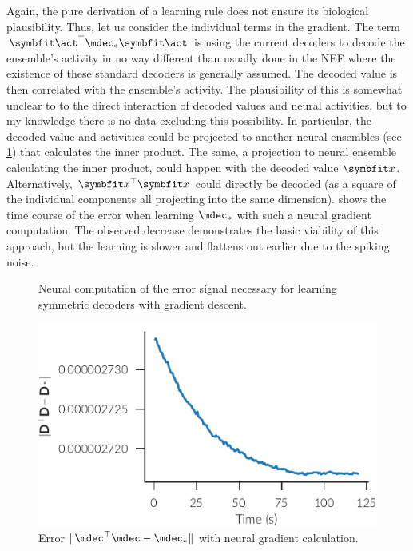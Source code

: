 Again, the pure derivation of a learning rule does not ensure its biological plausibility.
Thus, let us consider the individual terms in the gradient.
The term $\vc\act\Tr \mdec_* \vc\act$ is using the current decoders to decode the ensemble's activity in no way different than usually done in the NEF where the existence of these standard decoders is generally assumed.
The decoded value is then correlated with the ensemble's activity.
The plausibility of this is somewhat unclear to to the direct interaction of decoded values and neural activities, but to my knowledge there is no data excluding this possibility.
In particular, the decoded value and activities could be projected to another neural ensembles (see \cref{fig:aml-grad-desc}) that calculates the inner product.
The same, a projection to neural ensemble calculating the inner product, could happen with the decoded value $\vc x$.
Alternatively, $\vc x\Tr \vc x$ could directly be decoded (as a square of the individual components all projecting into the same dimension).
 shows the time course of the error when learning $\mdec_*$ with such a neural gradient computation.
The observed decrease demonstrates the basic viability of this approach, but the learning is slower and flattens out earlier due to the spiking noise.
\begin{figure}
    \centering
    \caption{Neural computation of the error signal necessary for learning symmetric decoders with gradient descent.}\label{fig:aml-grad-desc}
\end{figure}
\begin{figure}
    \centering
    \includegraphics{figures/aml-neural-grad-err}
    \caption{Error $\lVert \mdec\Tr\mdec - \mdec_*\rVert$ with neural gradient calculation.}\label{fig:aml:neural-grad-err}
\end{figure}


